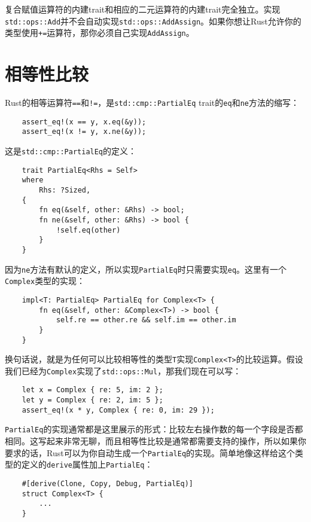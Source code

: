 复合赋值运算符的内建trait和相应的二元运算符的内建trait完全独立。实现\\
\texttt{std::ops::Add}并不会自动实现\texttt{std::ops::AddAssign}。如果你想让Rust允许你的类型使用\texttt{+=}运算符，那你必须自己实现\texttt{AddAssign}。

\section{相等性比较}\label{equal}

Rust的相等运算符\texttt{==}和\texttt{!=}，是\texttt{std::cmp::PartialEq} trait的\texttt{eq}和\texttt{ne}方法的缩写：
\begin{verbatim}
    assert_eq!(x == y, x.eq(&y));
    assert_eq!(x != y, x.ne(&y));
\end{verbatim}

这是\texttt{std::cmp::PartialEq}的定义：
\begin{verbatim}
    trait PartialEq<Rhs = Self>
    where
        Rhs: ?Sized,
    {
        fn eq(&self, other: &Rhs) -> bool;
        fn ne(&self, other: &Rhs) -> bool {
            !self.eq(other)
        }
    }
\end{verbatim}

因为\texttt{ne}方法有默认的定义，所以实现\texttt{PartialEq}时只需要实现\texttt{eq}。这里有一个\texttt{Complex}类型的实现：
\begin{verbatim}
    impl<T: PartialEq> PartialEq for Complex<T> {
        fn eq(&self, other: &Complex<T>) -> bool {
            self.re == other.re && self.im == other.im
        }
    }
\end{verbatim}

换句话说，就是为任何可以比较相等性的类型\texttt{T}实现\texttt{Complex<T>}的比较运算。假设我们已经为\texttt{Complex}实现了\texttt{std::ops::Mul}，那我们现在可以写：
\begin{verbatim}
    let x = Complex { re: 5, im: 2 };
    let y = Complex { re: 2, im: 5 };
    assert_eq!(x * y, Complex { re: 0, im: 29 });
\end{verbatim}

\texttt{PartialEq}的实现通常都是这里展示的形式：比较左右操作数的每一个字段是否都相同。这写起来非常无聊，而且相等性比较是通常都需要支持的操作，所以如果你要求的话，Rust可以为你自动生成一个\texttt{PartialEq}的实现。简单地像这样给这个类型的定义的\texttt{derive}属性加上\texttt{PartialEq}：
\begin{verbatim}
    #[derive(Clone, Copy, Debug, PartialEq)]
    struct Complex<T> {
        ...
    }
\end{verbatim}

